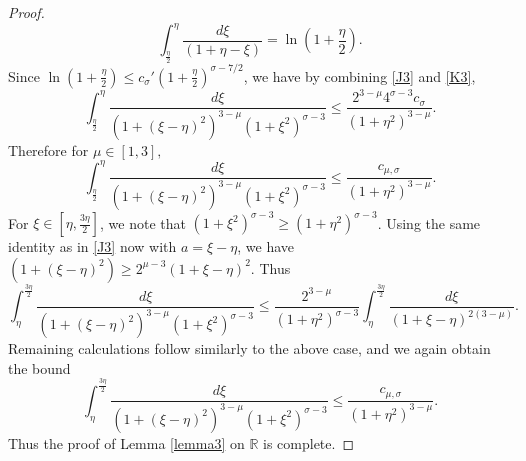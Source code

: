 \documentclass[10pt,a4paper]{amsart}
\begin{document}
\begin{proof}
\begin{equation}
        \int_{\frac{\eta}{2}}^{\eta}\frac{d\xi}{(1+\eta-\xi)}
        = \ln\left(1 + \frac\eta2\right).
\end{equation}
Since $\ln\left(1 + \frac\eta2\right) \leq c_{\sigma}'\left(1 + \frac\eta2\right)^{\sigma-7/2}$, we have by combining \eqref{J3} and \eqref{K3}, 
\begin{equation}
    \int_{\frac{\eta}{2}}^{\eta}\frac{d \xi}{(1+(\xi - \eta)^2)^{3-\mu}(1 + \xi^2)^{\sigma-3}} 
        \leq \frac{2^{3-\mu}4^{\sigma-3}c_{\sigma}}{(1+\eta^2)^{3-\mu}}.
\end{equation}
Therefore for $\mu \in \left[1,3\right],$
\begin{equation}
    \int_{\frac{\eta}{2}}^{\eta}\frac{d \xi}{(1+(\xi - \eta)^2)^{3-\mu}(1 + \xi^2)^{\sigma-3}} 
        \leq \frac{c_{\mu,\sigma}}{(1+\eta^2)^{3-\mu}}.
\end{equation}
For $\xi \in \left[\eta,\frac{3\eta}{2}\right]$, we note that $(1+\xi^2)^{\sigma - 3} \geq (1 + \eta^2)^{\sigma - 3}$. 
Using the same identity as in \eqref{J3} now with $a = \xi - \eta$, we have $(1 + (\xi - \eta)^2) \geq 2^{\mu-3}(1 + \xi - \eta)^2$. 
Thus
\begin{equation}\label{J4}
    \int_{\eta}^{\frac{3\eta}{2}}\frac{d \xi}{(1+(\xi - \eta)^2)^{3-\mu}(1 + \xi^2)^{\sigma-3}} 
        \leq \frac{2^{3-\mu}}{(1+\eta^2)^{\sigma-3}}\int^{\frac{3\eta}{2}}_{\eta}\frac{d\xi}{(1+\xi-\eta)^{2(3-\mu)}}.
\end{equation}
Remaining calculations follow similarly to the above case, and we again obtain the bound 
\begin{equation}
    \int_{\eta}^{\frac{3\eta}{2}}\frac{d \xi}{(1+(\xi - \eta)^2)^{3-\mu}(1 + \xi^2)^{\sigma-3}} 
        \leq \frac{c_{\mu,\sigma}}{(1+\eta^2)^{3-\mu}}.
\end{equation}
Thus the proof of Lemma \ref{lemma3} on $\mathbb{R}$ is complete.
\end{proof}
\end{document}
